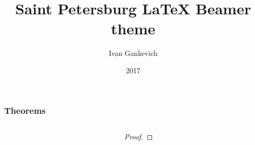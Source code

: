 \documentclass[aspectratio=169]{beamer}
\title{Saint Petersburg LaTeX Beamer theme}
\author{Ivan Gankevich}
\institute{Saint Petersburg State University}
\date{2017}
\begin{document}
\begin{frame}
	\frametitle{Theorems}
    \begin{columns}[T]
        \begin{column}{0.45\textwidth}
			\begin{example}\end{example}
			\begin{examples}\end{examples}
			\begin{definition}\end{definition}
			\begin{definitions}\end{definitions}
        \end{column}
        \begin{column}{0.45\textwidth}
			\begin{theorem}[Fermat]\end{theorem}
			\begin{proof}[Proof\nopunct]\end{proof}
			\begin{corollary}\end{corollary}
			\begin{lemma}\end{lemma}
			\begin{fact}\end{fact}
        \end{column}
	\end{columns}
	\nocite*{}
	
	
\end{frame}
\end{document}
